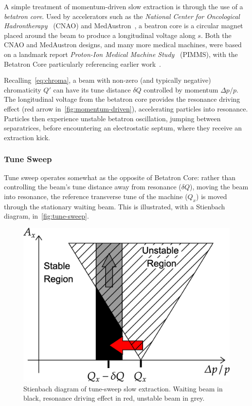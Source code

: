 \documentclass[11pt]{report}
\begin{document}
A simple treatment of momentum-driven slow extraction is through the use of a \textit{betatron core}. Used by accelerators such as the \textit{National Center for Oncological Hadrontherapy}~\cite{Falbo:IPAC2018-TUZGBF3} (CNAO) and MedAustron~\cite{pablo}, a beatron core is a circular magnet placed around the beam to produce a longitudinal voltage along $s$. Both the CNAO and MedAustron designs, and many more medical machines, were based on a landmark report \textit{Proton-Ion Medical Machine Study}~\cite{PIMMS} (PIMMS), with the Betatron Core particularly referencing earlier work~\cite{betatroncore}.

Recalling~\autoref{eq:chroma}, a beam with non-zero (and typically negative) chromaticity $Q'$ can have its tune distance $\delta Q$ controlled by momentum $\Delta p/p$. The longitudinal voltage from the betatron core provides the resonance driving effect (red arrow in~\autoref{fig:momentum-driven}), accelerating particles into resonance. Particles then experience unstable betatron oscillation, jumping between separatrices, before encountering an electrostatic septum, where they receive an extraction kick.

\subsubsection{Tune Sweep}
Tune sweep operates somewhat as the opposite of Betatron Core: rather than controlling the beam's tune distance away from resonance ($\delta Q$), moving the beam into resonance, the reference transverse tune of the machine ($Q_x$) is moved through the stationary waiting beam. This is illustrated, with a Stienbach diagram, in~\autoref{fig:tune-sweep}.

\begin{figure}
  \centering
  \includegraphics[width=0.6\linewidth]{tune-sweep.png}
  \caption{Stienbach diagram of tune-sweep slow extraction. Waiting beam in black, resonance driving effect in red, unstable beam in grey.}\label{fig:tune-sweep}
\end{figure}
\end{document}

